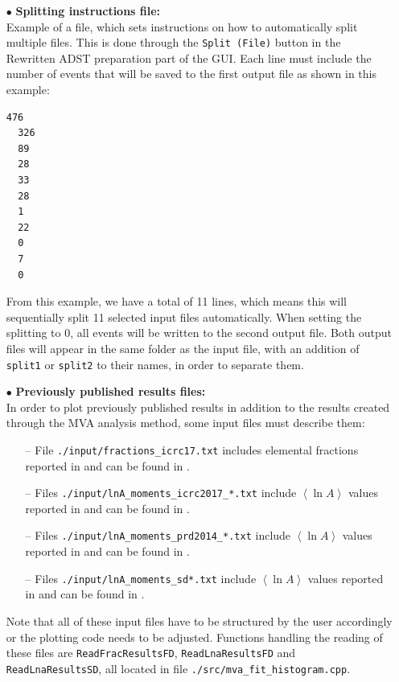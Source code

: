 \documentclass[12pt,a4paper]{report}
\begin{document}
\begin{itemize}
\item[$\bullet$] \textbf{Splitting instructions file:}\\Example of a file, which sets instructions on how to automatically split multiple files. This is done through the \texttt{Split (File)} button in the Rewritten ADST preparation part of the GUI. Each line must include the number of events that will be saved to the first output file as shown in this example:
\begin{lstlisting}[language=bash]
  476
  326
  89
  28
  33
  28
  1
  22
  0
  7
  0
\end{lstlisting}
From this example, we have a total of 11 lines, which means this will sequentially split 11 selected input files automatically. When setting the splitting to 0, all events will be written to the second output file. Both output files will appear in the same folder as the input file, with an addition of \texttt{split1} or \texttt{split2} to their names, in order to separate them.
\item[$\bullet$] \textbf{Previously published results files:}\\In order to plot previously published results in addition to the results created through the MVA analysis method, some input files must describe them:
	\begin{itemize}
	\item[--] File \texttt{./input/fractions\_icrc17.txt} includes elemental fractions reported in \cite{xmaxICRC2017} and can be found in \cite{CompositionAugerWiki}.
	\item[--] Files \texttt{./input/lnA\_moments\_icrc2017\_*.txt} include $\left<\ln A\right>$ values reported in \cite{xmaxICRC2017} and can be found in \cite{CompositionAugerWiki}.
	\item[--] Files \texttt{./input/lnA\_moments\_prd2014\_*.txt} include $\left<\ln A\right>$ values reported in \cite{xmaxDistFitPRD2014} and can be found in \cite{UngerComposition}.
	\item[--] Files \texttt{./input/lnA\_moments\_sd*.txt} include $\left<\ln A\right>$ values reported in \cite{deltaMethod} and can be found in \cite{DeltaComposition}.
	\end{itemize}
Note that all of these input files have to be structured by the user accordingly or the plotting code needs to be adjusted. Functions handling the reading of these files are \texttt{ReadFracResultsFD}, \texttt{ReadLnaResultsFD} and \texttt{ReadLnaResultsSD}, all located in file \texttt{./src/mva\_fit\_histogram.cpp}.
\end{itemize}
\end{document}
